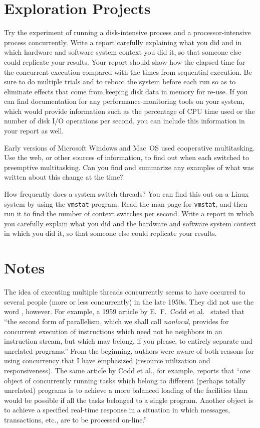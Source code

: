 \section*{Exploration Projects}
\begin{chapterEnumerate}
\item
Try the experiment of running a disk-intensive process and a
processor-intensive process concurrently.  Write a report carefully
explaining what you did and in which hardware and software system context
you did it, so that someone else could replicate your
results.  Your report should show how the elapsed time for the
concurrent execution compared with the times from sequential
execution.  Be sure to do multiple trials and to reboot the system
before each run so as to eliminate effects that come from keeping disk
data in memory for re-use.  If you can find documentation for any
performance-monitoring tools on your system, which would provide
information such as the percentage of CPU time used or the number of
disk I/O operations per second, you can include this information in
your report as well.
\item
Early versions of Microsoft Windows and Mac~OS used cooperative
multitasking.  Use the web, or other sources of information, to find
out when each switched to preemptive multitasking.  Can you find and
summarize any examples of what was written about this change at the
time?
\item
How frequently does a system switch threads?  You can find this out on
a Linux system by using the \verb|vmstat| program.  Read the
man page for \verb|vmstat|, and then run it to find the number of context
switches per second.
Write a report in which you carefully
explain what you did and the hardware and software system context in
which you did it, so that someone else could replicate your
results.
\end{chapterEnumerate}

\section*{Notes}
The idea of executing multiple threads concurrently seems to have
occurred to several people (more or less concurrently) in the late
1950s.  They did not use the word , however.  For example, a
1959 article by E.~F.\ Codd et al.~\cite{max984} stated that
``the second form of parallelism, which we shall call {\em nonlocal},
provides for concurrent execution of instructions which need not be
neighbors in an instruction stream, but which may belong, if you
please, to entirely separate and unrelated programs.''  From the
beginning, authors were aware of both reasons for using concurrency that I have emphasized
(resource utilization and responsiveness).  The same article by Codd
et al., for example, reports that ``one object of concurrently
running tasks which belong to different (perhaps totally unrelated)
programs is to achieve a more balanced loading of the facilities than
would be possible if all the tasks belonged to a single program.
Another object is to achieve a specified real-time response in a
situation in which messages, transactions, etc., are to be processed
on-line.''


